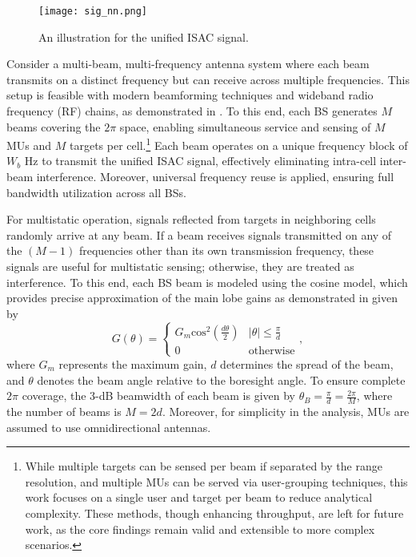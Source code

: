 \documentclass[journal]{IEEEtran}
\begin{document}
 
\begin{figure}[t]
\centering
  \texttt{[image: sig\_nn.png]}
    \caption{An illustration for the unified ISAC signal.}
    \label{sgn_mod}
\end{figure}


Consider a multi-beam, multi-frequency antenna system where each beam transmits on a distinct frequency but can receive across multiple frequencies. This setup is feasible with modern beamforming techniques and wideband radio frequency (RF) chains, as demonstrated in \cite{hong2017multibeam,8529214}. To this end, each BS generates \( M \) beams covering the \( 2\pi \) space, enabling simultaneous service and sensing of \( M \) MUs and \( M \) targets per cell.\footnote{While multiple targets can be sensed per beam if separated by the range resolution, and multiple MUs can be served via user-grouping techniques, this work focuses on a single user and target per beam to reduce analytical complexity. These methods, though enhancing throughput, are left for future work, as the core findings remain valid and extensible to more complex scenarios.}
Each beam operates on a unique frequency block of \( W_b \) Hz to transmit the unified ISAC signal, effectively eliminating intra-cell inter-beam interference. Moreover, universal frequency reuse is applied, ensuring full bandwidth utilization across all BSs.



For multistatic operation, signals reflected from targets in neighboring cells randomly arrive at any beam. If a beam receives signals transmitted on any of the $(M-1)$ frequencies other than its own transmission frequency, these signals are useful for multistatic sensing; otherwise, they are treated as interference.
To this end, each BS beam is modeled using the cosine model, which provides precise approximation of the main lobe gains as demonstrated in \cite{yu2017coverage} given by 
\begin{equation}\label{ant_be_ga}
G(\theta) =
\left\{
	\begin{array}{ll}
		G_m \mathrm{cos}^2 (\frac{d\theta}{2})  &  |\theta| \leq \frac{\pi}{d}\\
		0             &   \text{otherwise}
	\end{array}
\right.,
\end{equation}
where $G_m$ represents the maximum gain, $d$ determines the spread of the beam, and $\theta$ denotes the beam angle relative to the boresight angle. To ensure complete $2\pi$ coverage, the 3-dB beamwidth of each beam is given by $\theta_B = \frac{\pi}{d} = \frac{2\pi}{M}$, where the number of beams is $M = 2d$. 
Moreover, for simplicity in the analysis, MUs are assumed to use omnidirectional antennas. 
\end{document}
